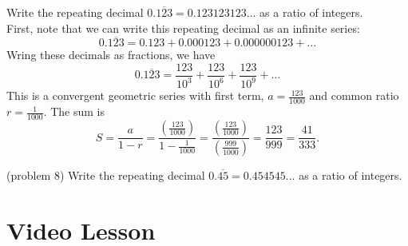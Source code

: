 \documentclass[handout]{ximera}
\begin{document}
\begin{example}[example 8]
Write the repeating decimal $0.\overline{123} = 0.123123123...$ as a ratio of integers.\\
First, note that we can write this repeating decimal as an infinite series:
\[
0.\overline{123} = 0.123 + 0.000123 + 0.000000123 + \dots
\]
Wring these decimals as fractions, we have
\[
0.\overline{123} =\frac{123}{10^3} + \frac{123}{10^6}+\frac{123}{10^9} + \dots
\]
This is a convergent geometric series with first term, $a = \frac{123}{1000}$ and common ratio $r = \frac{1}{1000}$.
The sum is 
\[
S = \frac{a}{1-r} = \frac{\left(\frac{123}{1000}\right)}{1-\frac{1}{1000}} = \frac{\left(\frac{123}{1000}\right)}{\left(\frac{999}{1000}\right)}
= \frac{123}{999} = \frac{41}{333}.
\]

\end{example}

\begin{problem}(problem 8)
Write the repeating decimal $0.\overline{45} = 0.454545...$ as a ratio of integers.\\
\begin{multipleChoice}
\end{multipleChoice}
\end{problem}
\section{Video Lesson}


\begin{center}
\begin{foldable}
\end{foldable}
\end{center}
\end{document}
